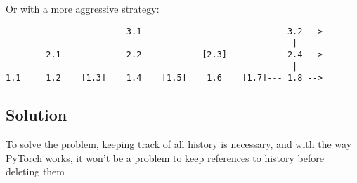 Or with a more aggressive strategy:

\newpage
\begin{lstlisting}
                        3.1 --------------------------- 3.2 -->
                                                         |
        2.1             2.2            [2.3]----------- 2.4 -->
                                                         |
1.1     1.2    [1.3]    1.4    [1.5]    1.6    [1.7]--- 1.8 -->
\end{lstlisting}

\subsection{Solution}

To solve the problem, keeping track of all history is necessary, and
with the way PyTorch works, it won't be a problem to keep references to
history before deleting them
